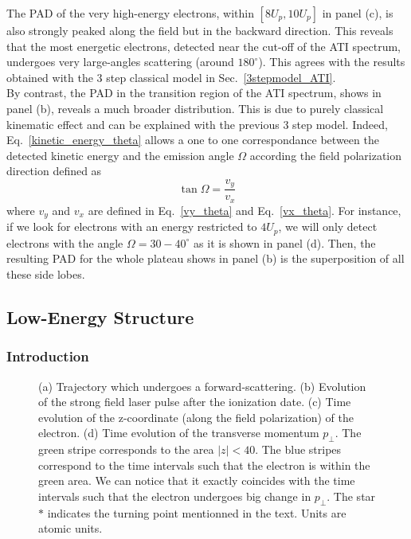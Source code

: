 \documentclass[a4paper]{article}
\begin{document}
The PAD of the very high-energy electrons, within $[8U_{p}, 10U_{p}]$ in panel (c), is also strongly peaked along the field but in the backward direction. This reveals that the most energetic electrons, detected near the cut-off of the ATI spectrum, undergoes very large-angles scattering (around $180^{\circ}$). This agrees with the results obtained with the 3 step classical model in Sec.~\ref{3stepmodel_ATI}.  \\
By contrast, the PAD in the transition region of the ATI spectrum, shows in panel (b), reveals a much broader distribution. This is due to purely classical kinematic effect and can be explained with the previous 3 step model. Indeed, Eq.~\ref{kinetic_energy_theta} allows a one to one correspondance between the detected kinetic energy and the emission angle $\Omega$ according the field polarization direction defined as
\begin{equation}
\tan{\Omega}=\frac{v_{y}}{v_{x}}
\end{equation}
where $v_{y}$ and $v_{x}$ are defined in Eq.~\ref{vy_theta} and Eq.~\ref{vx_theta}.
For instance, if we look for electrons with an energy restricted to $4U_{p}$, we will only detect electrons with the angle $\Omega=30-40^{\circ}$ as it is shown in panel (d). Then, the resulting PAD for the whole plateau shows in panel (b) is the superposition of all these side lobes.


\subsection{Low-Energy Structure}
\subsubsection{Introduction}
\label{soft_rescattering_section}
\begin{figure}[htp]
 \resizebox{1\textwidth}{!}{}
 \caption{ (a) Trajectory which undergoes a forward-scattering. (b) Evolution of the strong field laser pulse after the ionization date. (c) Time evolution of the z-coordinate (along the field polarization) of the electron. (d) Time evolution of the transverse momentum $p_{\perp}$. The green stripe corresponds to the area $|z|<40$. The blue stripes correspond to the time intervals such that the electron is within the green area. We can notice that it exactly coincides with the time intervals such that the electron undergoes big change in $p_{\perp}$. The star $*$ indicates the turning point mentionned in the text. Units are atomic units.}
 \label{soft_recollision}
\end{figure}
\end{document}
